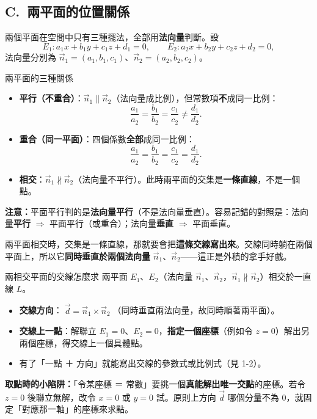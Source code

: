 \documentclass[11pt]{article}
\begin{document}
\subsection*{\sffamily C.\ 兩平面的位置關係}

兩個平面在空間中只有三種擺法，全部用\textbf{法向量}判斷。設
$$E_1:a_1x+b_1y+c_1z+d_1=0,\qquad E_2:a_2x+b_2y+c_2z+d_2=0,$$
法向量分別為 $\vec n_1=(a_1,b_1,c_1)$、$\vec n_2=(a_2,b_2,c_2)$。

\begin{補充框}{兩平面的三種關係}
\begin{itemize}\setlength{\itemsep}{2pt}
\item \textbf{平行（不重合）}：$\vec n_1\parallel\vec n_2$（法向量成比例），但常數項\textbf{不}成同一比例：
$$\frac{a_1}{a_2}=\frac{b_1}{b_2}=\frac{c_1}{c_2}\ne\frac{d_1}{d_2}.$$
\item \textbf{重合（同一平面）}：四個係數\textbf{全部}成同一比例：
$$\frac{a_1}{a_2}=\frac{b_1}{b_2}=\frac{c_1}{c_2}=\frac{d_1}{d_2}.$$
\item \textbf{相交}：$\vec n_1\not\parallel\vec n_2$（法向量不平行）。此時兩平面的交集是\textbf{一條直線}，不是一個點。
\end{itemize}
\end{補充框}

\textbf{注意：}平面平行判的是\textbf{法向量平行}（不是法向量垂直）。容易記錯的對照是：法向量\textbf{平行} $\Rightarrow$ 平面平行（或重合）；法向量\textbf{垂直} $\Rightarrow$ 平面垂直。

兩平面相交時，交集是一條直線，那就要會把\textbf{這條交線寫出來}。交線同時躺在兩個平面上，所以它\textbf{同時垂直於兩個法向量} $\vec n_1$、$\vec n_2$——這正是外積的拿手好戲。


\begin{補充框}{兩相交平面的交線怎麼求}
兩平面 $E_1$、$E_2$（法向量 $\vec n_1$、$\vec n_2$，$\vec n_1\not\parallel\vec n_2$）相交於一直線 $L$。
\begin{itemize}\setlength{\itemsep}{2pt}
\item \textbf{交線方向}：$\boxed{\;\vec d=\vec n_1\times\vec n_2\;}$（同時垂直兩法向量，故同時順著兩平面）。
\item \textbf{交線上一點}：解聯立 $E_1=0$、$E_2=0$，\textbf{指定一個座標}（例如令 $z=0$）解出另兩個座標，得交線上一個具體點。
\item 有了「一點 ＋ 方向」就能寫出交線的參數式或比例式（見 1-2）。
\end{itemize}
\textbf{取點時的小陷阱：}「令某座標 ＝ 常數」要挑一個\textbf{真能解出唯一交點}的座標。若令 $z=0$ 後聯立無解，改令 $x=0$ 或 $y=0$ 試。原則上方向 $\vec d$ 哪個分量不為 0，就固定「對應那一軸」的座標來求點。
\end{補充框}
\end{document}
